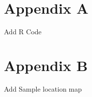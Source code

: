 \documentclass[]{interact}
\theoremstyle{plain}%
\theoremstyle{definition}
\theoremstyle{remark}
\begin{document}
\newpage

\hypertarget{appendix-a}{%
\section{Appendix A}\label{appendix-a}}

Add R Code

\hypertarget{appendix-b}{%
\section{Appendix B}\label{appendix-b}}

Add Sample location map
\end{document}
